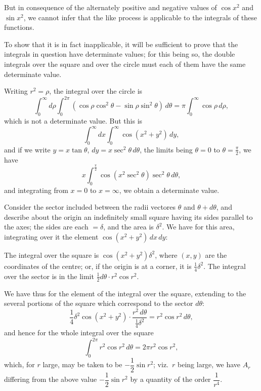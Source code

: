 \documentclass[11pt,a4paper]{article}
\theoremstyle{plain}
\theoremstyle{definition}
\theoremstyle{remark}
\begin{document}
\newpage

But in consequence of the alternately positive and negative values of $\cos x^2$ and $\sin x^2$, we cannot infer that the like process is applicable to the integrals of these functions.

To show that it is in fact inapplicable, it will be sufficient to prove that the integrals in question have determinate values; for this being so, the double integrals over the square and over the circle must each of them have the same determinate value.

Writing $r^2 = \rho$, the integral over the circle is
\[
\int_0^{\infty} d\rho \int_0^{2\pi} (\cos \rho \cos^2 \theta - \sin \rho \sin^2 \theta)\,d\theta = \pi \int_0^{\infty} \cos \rho\,d\rho,
\]
which is not a determinate value. But this is
\[
\int_0^{\infty} dx \int_0^{\infty} \cos(x^2 + y^2)\,dy,
\]
and if we write $y = x \tan \theta$, $dy = x \sec^2 \theta\,d\theta$, the limits being $\theta = 0$ to $\theta = \frac{\pi}{2}$, we have
\[
x \int_0^{\frac{\pi}{2}} \cos(x^2 \sec^2 \theta) \sec^2 \theta\,d\theta,
\]
and integrating from $x = 0$ to $x = \infty$, we obtain a determinate value.

\newpage

Consider the sector included between the radii vectores $\theta$ and $\theta + d\theta$, and describe about the origin an indefinitely small square having its sides parallel to the axes; the sides are each $= \delta$, and the area is $\delta^2$. We have for this area, integrating over it the element $\cos(x^2 + y^2)\,dx\,dy$:

The integral over the square is $\cos(x^2 + y^2)\delta^2$, where $(x,y)$ are the coordinates of the centre; or, if the origin is at a corner, it is $\frac{1}{4}\delta^2$. The integral over the sector is in the limit $\frac{1}{2}d\theta \cdot r^2 \cos r^2$.

We have thus for the element of the integral over the square, extending to the several portions of the square which correspond to the sector $d\theta$:
\[
\frac{1}{4}\delta^2 \cos(x^2 + y^2) \cdot \frac{r^2\,d\theta}{\frac{1}{4}\delta^2} = r^2 \cos r^2\,d\theta,
\]
and hence for the whole integral over the square
\[
\int_0^{2\pi} r^2 \cos r^2\,d\theta = 2\pi r^2 \cos r^2,
\]
which, for $r$ large, may be taken to be $-\dfrac{1}{2}\sin r^2$; viz.\ $r$ being large, we have $A_r$ differing from the above value $-\dfrac{1}{2}\sin r^2$ by a quantity of the order $\dfrac{1}{r^4}$.

\newpage
\end{document}

